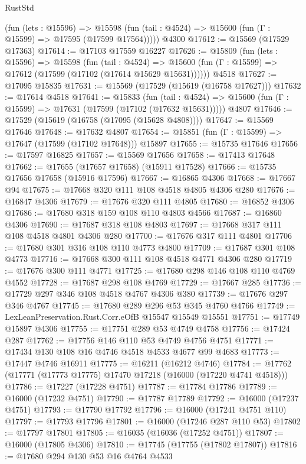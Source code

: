\begin{lexlean}{RustStd}
\begin{coremodule}
{\begin{coremodule}
{{{{{{{{{{{{{{{{{{{{{{{{{{{{{{{{{{{{{{{{{{{{{{{{{{{{{{{{{{{{      (fun (lets : @15596) =>
      @15598 (fun (tail : @4524) => @15600 (fun (Γ : @15599) => @17595 (@17599 @17564)))))
    @4300
@17612 := @15569 (@17529 @17363)
@17614 := @17103 @17559 @16227
@17626 := @15809
    (fun (lets : @15596) =>
    @15598
      (fun (tail : @4524) =>
      @15600 (fun (Γ : @15599) => @17612 (@17599 (@17102 (@17614 @15629 @15631))))))
    @4518
@17627 := @17095 @15835
@17631 := @15569 (@17529 (@15619 (@16758 @17627)))
@17632 := @17614 @4518
@17641 := @15833
    (fun (tail : @4524) => @15600 (fun (Γ : @15599) => @17631 (@17599 (@17102 (@17632 @15631)))))
    @4807
@17646 := @17529 (@15619 (@16758 (@17095 (@15628 @4808))))
@17647 := @15569 @17646
@17648 := @17632 @4807
@17654 := @15851 (fun (Γ : @15599) => @17647 (@17599 (@17102 @17648))) @15897
@17655 := @15735 @17646
@17656 := @17597 @16825
@17657 := @15569 @17656
@17658 := @17413 @17648
@17662 := @17655 (@17657 @17658) (@15911 @17528)
@17666 := @15735 @17656 @17658 (@15916 @17596)
@17667 := @16865 @4306
@17668 := @17667 @94
@17675 := @17668 @320 @111 @108 @4518 @4805 @4306 @280
@17676 := @16847 @4306
@17679 := @17676 @320 @111 @4805
@17680 := @16852 @4306
@17686 := @17680 @318 @159 @108 @110 @4803 @4566
@17687 := @16860 @4306
@17690 := @17687 @318 @108 @4803
@17697 := @17668 @317 @111 @108 @4518 @4801 @4306 @280
@17700 := @17676 @317 @111 @4801
@17706 := @17680 @301 @316 @108 @110 @4773 @4800
@17709 := @17687 @301 @108 @4773
@17716 := @17668 @300 @111 @108 @4518 @4771 @4306 @280
@17719 := @17676 @300 @111 @4771
@17725 := @17680 @298 @146 @108 @110 @4769 @4552
@17728 := @17687 @298 @108 @4769
@17729 := @17667 @285
@17736 := @17729 @297 @346 @108 @4518 @4767 @4306 @380
@17739 := @17676 @297 @346 @4767
@17745 := @17680 @289 @296 @53 @345 @4760 @4766
@17749 := LexLeanPreservation.Rust.Corr.eOfB @15547 @15549 @15551
@17751 := @17749 @15897 @4306
@17755 := @17751 @289 @53 @4749 @4758
@17756 := @17424 @287
@17762 := @17756 @146 @110 @53 @4749 @4756 @4751
@17771 := @17434 @130 @108 @16 @4746 @4518 @4533 @4677 @99 @4683
@17773 := @17447 @4746 @16911
@17775 := @16211 (@16212 @4746)
@17784 := @17762 (@17771 (@17773 @17775) @17470 @17218 (@16000 (@17220 @4741 @4518)))
@17786 := @17227 (@17228 @4751)
@17787 := @17784 @17786
@17789 := @16000 (@17232 @4751)
@17790 := @17787 @17789
@17792 := @16000 (@17237 @4751)
@17793 := @17790 @17792
@17796 := @16000 (@17241 @4751 @110)
@17797 := @17793 @17796
@17801 := @16000 (@17246 @287 @110 @53)
@17802 := @17797 @17801
@17805 := @16035 (@16036 (@17252 @4751))
@17807 := @16000 (@17805 @4306)
@17810 := @17745 (@17755 (@17802 @17807))
@17816 := @17680 @294 @130 @53 @16 @4764 @4533
}}}}}}}}}}}}}}}}}}}}}}}}}}}}}}}}}}}}}}}}}}}}}}}}}}}}}}}}}}}}
\end{coremodule}}
\end{coremodule}
\end{lexlean}
